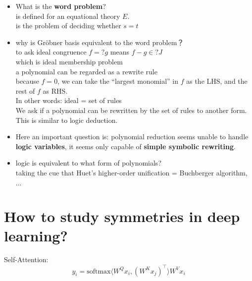 \begin{itemize}
	\item What is the \textbf{word problem}? \\
	is defined for an equational theory $E$. \\
	is the problem of deciding whether $s = t$
	
	\item why is Gr\"{o}bner basis equivalent to the word problem？ \\
	to ask ideal congruence $f =? g$ means $f - g \in? J$ \\
	which is ideal membership problem \\
	a polynomial can be regarded as a rewrite rule \\
	because $f = 0$, we can take the ``largest monomial'' in $f$ as the LHS, and the rest of $f$ as RHS. \\
	In other words:  ideal = set of rules \\
	We ask if a polynomial can be rewritten by the set of rules to another form.  \\
	This is similar to logic deduction.
	
	\item Here an important question is: polynomial reduction seems unable to handle \textbf{logic variables}, it seems only capable of \textbf{simple symbolic rewriting}.
	
	\item logic is equivalent to what form of polynomials? \\
	taking the cue that Huet's higher-order unification = Buchberger algorithm, ...
\end{itemize}

\section{How to study symmetries in deep learning?}

Self-Attention:
\begin{equation}
y_i = \mathrm{softmax} \langle W^Q x_i , (W^K x_j)^\top \rangle W^V x_i
\end{equation}